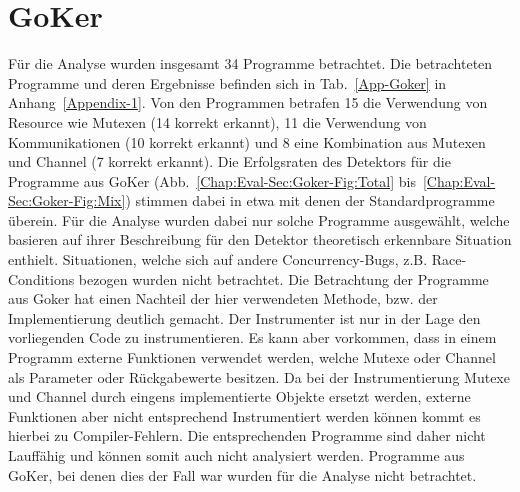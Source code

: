 \section{GoKer}
Für die Analyse wurden insgesamt 34 Programme betrachtet. Die betrachteten 
Programme und deren Ergebnisse befinden sich in Tab.~\ref{App-Goker} 
in Anhang~\ref{Appendix-1}. Von den Programmen betrafen 15 die 
Verwendung von Resource wie Mutexen (14 korrekt erkannt), 11 die 
Verwendung von Kommunikationen (10 korrekt erkannt) und 8 eine Kombination aus Mutexen und 
Channel (7 korrekt erkannt).
Die Erfolgsraten des Detektors für die Programme aus GoKer 
(Abb.~\ref{Chap:Eval-Sec:Goker-Fig:Total} bis~\ref{Chap:Eval-Sec:Goker-Fig:Mix})
stimmen dabei in etwa mit denen der Standardprogramme überein.
Für die Analyse wurden dabei nur solche Programme ausgewählt,
welche basieren auf ihrer Beschreibung für den Detektor theoretisch erkennbare 
Situation enthielt. Situationen, welche sich auf andere Concurrency-Bugs,
z.B. Race-Conditions bezogen wurden nicht betrachtet. 
Die Betrachtung der Programme aus Goker hat einen Nachteil der hier 
verwendeten Methode, bzw. der Implementierung deutlich gemacht.
Der Instrumenter ist nur in der Lage den vorliegenden Code zu instrumentieren. 
Es kann aber vorkommen, dass in einem Programm externe Funktionen 
verwendet werden, welche Mutexe oder Channel als Parameter oder 
Rückgabewerte besitzen. Da bei der Instrumentierung Mutexe und Channel 
durch eingens implementierte Objekte ersetzt werden, externe Funktionen 
aber nicht entsprechend Instrumentiert werden können kommt es 
hierbei zu Compiler-Fehlern. Die entsprechenden Programme sind daher nicht 
Lauffähig und können somit auch nicht analysiert werden. Programme aus GoKer, 
bei denen dies der Fall war wurden für die Analyse nicht betrachtet. 

